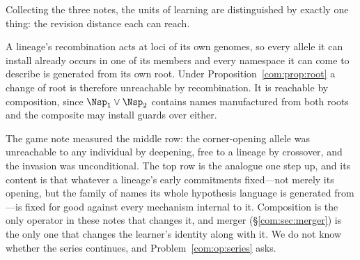 Collecting the three notes, the units of learning are distinguished by exactly one thing: the
revision distance each can reach.

\begin{table}[h]
\centering
\small
{}
\end{table}

\begin{proposition}\label{com:composition-reaches-what-no}
A lineage's recombination acts at loci of its own genomes, so every allele it can install already
occurs in one of its members and every namespace it can come to describe is generated from its own
root. Under Proposition~\ref{com:prop:root} a change of root is therefore unreachable by
recombination. It is reachable by composition, since $\Nsp_1 \vee \Nsp_2$ contains names
manufactured from both roots and the composite may install guards over either.
\end{proposition}

\begin{remark}\label{com:series-where-stops}
The game note measured the middle row: the corner-opening allele was unreachable to any
individual by deepening, free to a lineage by crossover, and the invasion was unconditional. The
top row is the analogue one step up, and its content is that whatever a lineage's early
commitments fixed---not merely its opening, but the family of names its whole hypothesis language
is generated from---is fixed for good against every mechanism internal to it. Composition is the
only operator in these notes that changes it, and merger (\S\ref{com:sec:merger}) is the only one
that changes the learner's identity along with it. We do not know whether the series continues,
and Problem~\ref{com:op:series} asks.
\end{remark}

